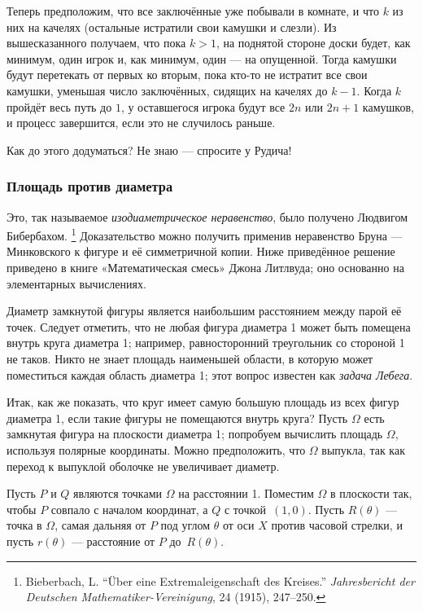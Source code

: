 Теперь предположим, что все заключённые уже побывали в комнате, и что $k$ из них на качелях (остальные истратили свои камушки и слезли).
Из вышесказанного получаем, что пока $k>1$, на поднятой стороне доски будет, как минимум, один игрок и, как минимум, один --- на опущенной.
Тогда камушки будут перетекать от первых ко вторым, пока кто-то не истратит все свои камушки, уменьшая число заключённых, сидящих на качелях до $k-1$.
Когда $k$ пройдёт весь путь до $1$, у оставшегося игрока будут все $2n$ или $2n+1$ камушков, и процесс завершится, если это не случилось раньше.
\heart

Как до этого додуматься?
Не  знаю --- спросите у Рудича!

\subsubsection*{Площадь против диаметра}

Это, так называемое \emph{изодиаметрическое неравенство}, было получено Людвигом Бибербахом.%
\footnote{Bieberbach, L. ``Über eine Extremaleigenschaft des Kreises.'' \emph{Jahresbericht der Deutschen Mathematiker-Vereinigung}, 24 (1915), 247--250.}
Доказательство можно получить применив неравенство Бруна --- Минковского к фигуре и её симметричной копии.
Ниже приведённое решение приведено в книге «Математическая смесь» Джона Литлвуда; оно основанно на элементарных вычислениях.

\medskip

Диаметр замкнутой фигуры является наибольшим расстоянием между парой её точек.
Следует отметить, что не любая фигура диаметра 1 может быть помещена внутрь круга диаметра 1;
например, равносторонний треугольник со стороной 1 не таков.
Никто не знает площадь наименьшей области, в которую может поместиться каждая область диаметра 1; этот вопрос известен как \emph{задача Лебега}. 

Итак, как же показать, что круг имеет самую большую площадь из всех фигур диаметра 1, если такие фигуры не помещаются внутрь круга?
Пусть $\Omega$ есть замкнутая фигура на плоскости диаметра 1; попробуем вычислить площадь $\Omega$, используя полярные координаты.
Можно предположить, что $\Omega$ выпукла, так как переход к выпуклой оболочке не увеличивает диаметр.

Пусть $P$ и $Q$ являются точками $\Omega$ на расстоянии 1.
Поместим $\Omega$ в плоскости так, чтобы $P$ совпало с началом координат, а $Q$ с точкой~$(1,0)$.
Пусть $R(\theta)$ --- точка в $\Omega$, самая дальняя от $P$ под углом $\theta$ от оси $X$ против часовой стрелки, и пусть $r(\theta)$ --- расстояние от $P$ до~$R(\theta)$.


